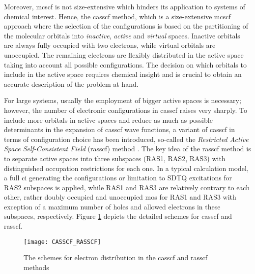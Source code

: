 \begin{refsection}
Moreover, \acrshort{mcscf} is not size-extensive which hinders its application to systems of chemical interest. Hence, the \acrshort{casscf} method,\cite{c1:roos1980,c1:roos1987} which is a size-extensive \acrshort{mcscf} approach where the selection of the configurations is based on the partitioning of the mole\-cular orbitals into \textit{inactive}, \textit{active} and \textit{virtual} spaces. Inactive orbitals are always fully occupied with two electrons, while virtual orbitals are unoccupied. The remaining electrons are flexibly distributed in the active space taking into account all possible configurations. The decision on which orbitals to include in the active space requires chemical insight and is crucial to obtain an accurate description of the problem at hand.




For large systems, usually the employment of bigger active spaces is necessary; however, the number of electronic configurations in \acrshort{casscf} raises very sharply. To include more orbitals in active spaces and reduce as much as possible determinants in the expansion of \acrshort{casscf} wave functions, a variant of \acrshort{casscf} in terms of configuration choice has been introduced, so-called the \emph{Restricted Active Space Self-Consistent Field} (\acrshort{rasscf}) method \cite{c1:olsen1988,c1:malmqvist1990}. The key idea of the \acrshort{rasscf} method is to separate active spaces into three subspaces (RAS1, RAS2, RAS3) with distinguished occupation restrictions for each one. In a typical calculation model, a full \acrshort{ci} generating the configurations or limitation to SDTQ excitations for RAS2 subspaces is applied, while RAS1 and RAS3 are relatively contrary to each other, rather doubly occupied and unoccupied \acrshort{mo}s for RAS1 and RAS3 with exception of a maximum number of holes and allowed electrons in these subspaces, respectively. Figure \ref{fig:CASSCF_RASSCF} depicts the detailed schemes for \acrshort{casscf} and \acrshort{rasscf}.



\begin{figure}[htb!]
	\centering
	\texttt{[image: CASSCF\_RASSCF]}
	\caption{The schemes for electron distribution in the \acrshort{casscf} and \acrshort{rasscf} methods}
	\label{fig:CASSCF_RASSCF}
\end{figure}








\end{refsection}

